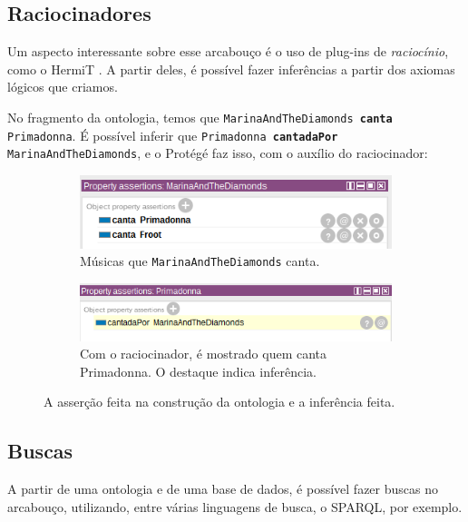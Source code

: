 \subsection{Raciocinadores}

Um aspecto interessante sobre esse arcabouço é o uso de plug-ins de \textit{raciocínio}, como o HermiT \cite{ferramentasHermit}. A partir deles, é possível fazer inferências a partir dos axiomas lógicos que criamos.

No fragmento da ontologia, temos que \texttt{MarinaAndTheDiamonds \textbf{canta} Primadonna}. É possível inferir que \texttt{Primadonna \textbf{cantadaPor} MarinaAndTheDiamonds}, e o Protégé faz isso, com o auxílio do raciocinador:

\begin{figure}[H]
	\centering
	\begin{subfigure}{.5\textwidth}
		\centering
		\includegraphics[width=0.9\linewidth]{Capitulos/Ferramentas/marinacanta}
		\caption{Músicas que \texttt{MarinaAndTheDiamonds} canta.}
	\end{subfigure}%
	\begin{subfigure}{.5\textwidth}
		\centering
		\includegraphics[width=0.95\linewidth]{Capitulos/Ferramentas/inferencia}
		\caption{Com o raciocinador, é mostrado quem canta Primadonna. O destaque indica inferência.}
	\end{subfigure}
	\caption{A asserção feita na construção da ontologia e a inferência feita.}
\end{figure}

\subsection{Buscas}

A partir de uma ontologia e de uma base de dados, é possível fazer buscas no arcabouço, utilizando, entre várias linguagens de busca, o SPARQL, por exemplo.

